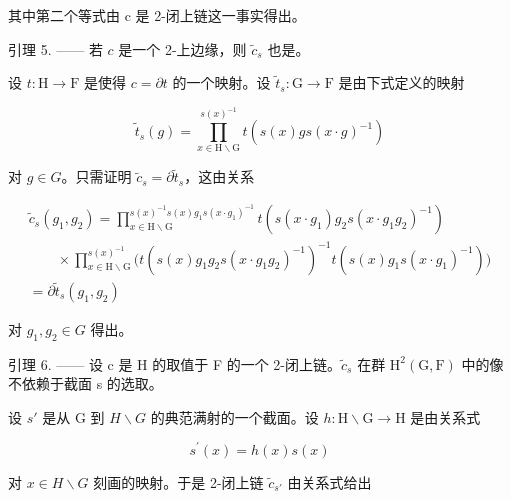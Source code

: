 其中第二个等式由 c 是 2-闭上链这一事实得出。

引理 5. —— 若 \(c\) 是一个 2-上边缘，则 \(\widetilde{c}_s\) 也是。

设 \(t: \mathrm{H} \to \mathrm{F}\) 是使得 \(c = \partial t\) 的一个映射。设 \(\widetilde{t}_s: \mathrm{G} \to \mathrm{F}\) 是由下式定义的映射

\[
\widetilde {t} _ {s} (g) = \prod_ {x \in \mathrm{H} \backslash \mathrm{G}} ^ {s (x) ^ {- 1}} t (s (x) g s (x \cdot g) ^ {- 1})
\]

对 \(g \in G\)。只需证明 \(\widetilde{c}_{s} = \partial\widetilde{t}_{s}\)，这由关系

\[
\begin{array}{l} \widetilde {c} _ {s} (g _ {1}, g _ {2}) = \prod_ {x \in \mathrm{H} \backslash \mathrm{G}} ^ {s (x) ^ {- 1} s (x) g _ {1} s (x \cdot g _ {1}) ^ {- 1}} t (s (x \cdot g _ {1}) g _ {2} s (x \cdot g _ {1} g _ {2}) ^ {- 1}) \\ \qquad \times \prod_ {x \in \mathrm{H} \backslash \mathrm{G}} ^ {s (x) ^ {- 1}} \big (t (s (x) g _ {1} g _ {2} s (x \cdot g _ {1} g _ {2}) ^ {- 1}) ^ {- 1} t (s (x) g _ {1} s (x \cdot g _ {1}) ^ {- 1}) \big) \\ = \partial \widetilde {t} _ {s} (g _ {1}, g _ {2}) \end{array}
\]

对 \(g_{1}, g_{2} \in G\) 得出。

引理 6. —— 设 c 是 H 的取值于 F 的一个 2-闭上链。\(\widetilde{c}_{s}\) 在群 \(\mathrm{H}^{2}(\mathrm{G},\mathrm{F})\) 中的像不依赖于截面 s 的选取。

设 \(s'\) 是从 G 到 \(H\backslash G\) 的典范满射的一个截面。设 \(h: \mathrm{H} \backslash \mathrm{G} \to \mathrm{H}\) 是由关系式

\[
s ^ {\prime} (x) = h (x) s (x)
\]

对 \(x \in H \backslash G\) 刻画的映射。于是 2-闭上链 \(\widetilde{c}_{s'}\) 由关系式给出

